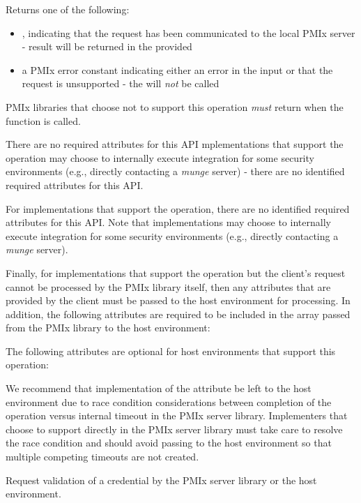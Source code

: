 Returns one of the following:

\begin{itemize}
    \item {}, indicating that the request has been communicated to the local \ac{PMIx} server - result will be returned in the provided 
    \item a \ac{PMIx} error constant indicating either an error in the input or that the request is unsupported - the  will \textit{not} be called
\end{itemize}

\reqattrstart
\ac{PMIx} libraries that choose not to support this operation \textit{must} return  when the function is called.

There are no required attributes for this \ac{API} mplementations that support the operation may choose to internally execute integration for some security environments (e.g., directly contacting a \textit{munge} server) - there are no identified required attributes for this \ac{API}.

For implementations that support the operation, there are no identified required
attributes for this \ac{API}. Note that implementations may choose to internally
execute integration for some security environments (e.g., directly
contacting a \textit{munge} server).

Finally, for implementations that support the operation but the client's request
cannot be processed by the \ac{PMIx} library itself, then any attributes that are provided by the client must be passed to the host environment for processing. In addition, the following attributes are required to be included in the  array passed from the \ac{PMIx} library to the host environment:


\reqattrend

\optattrstart
The following attributes are optional for host environments that support this operation:


\optattrend

\adviceimplstart
We recommend that implementation of the  attribute be left to the host environment due to race condition considerations between completion of the operation versus internal timeout in the \ac{PMIx} server library. Implementers that choose to support  directly in the \ac{PMIx} server library must take care to resolve the race condition and should avoid passing  to the host environment so that multiple competing timeouts are not created.
\adviceimplend


\descr

Request validation of a credential by the \ac{PMIx} server library or the host environment.



